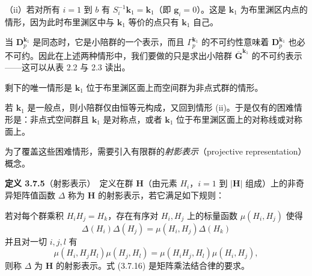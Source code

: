 （ii）若对所有 $i = 1$ 到 $b$ 有 $S^{-1}_{i}\mathbf{k}_{1} = \mathbf{k}_{1}$（即 $\mathbf{g}_{i} = 0$）。这是 $\mathbf{k}_{1}$ 为布里渊区内点的情形，因为此时布里渊区中与 $\mathbf{k}_{1}$ 等价的点只有 $\mathbf{k}_{1}$ 自己。

当 $\mathbf{D}^{\mathbf{k}_{1}}_{p}$ 是同态时，它是小陪群的一个表示，而且 $\Gamma^{\mathbf{k}_{1}}_{p}$ 的不可约性意味着 $\mathbf{D}^{\mathbf{k}_{1}}_{p}$ 也必不可约。因此在上述两种情形中，我们要做的只是求出小陪群 $\overline{\mathbf{G}}^{\mathbf{k}_{1}}$ 的不可约表示——这可以从表 2.2 与 2.3 读出。

剩下的唯一情形是 $\mathbf{k}_{1}$ 位于布里渊区面上而空间群为非点式群的情形。

若 $\mathbf{k}_{1}$ 是一般点，则小陪群仅由恒等元构成，又回到情形 (ii)。于是仅有的困难情形是：非点式空间群且 $\mathbf{k}_{1}$ 是对称点，或者 $\mathbf{k}_{1}$ 位于布里渊区面上的对称线或对称面上。

为了覆盖这些困难情形，需要引入有限群的\textit{射影表示}（projective representation）概念。

\noindent\textbf{定义 3.7.5}\quad （射影表示）\ 定义在群 $\mathbf{H}$（由元素 $H_{i}$，$i = 1$ 到 $|\mathbf{H}|$ 组成）上的非奇异矩阵值函数 $\Delta$ 称为 $\mathbf{H}$ 的射影表示，若它满足如下规则：

若对每个群乘积 $H_{i}H_{j} = H_{k}$，存在有序对 $H_{i}, H_{j}$ 上的标量函数 $\mu(H_{i}, H_{j})$ 使得
\begin{equation*}
\Delta(H_{i})\Delta(H_{j}) = \mu(H_{i}, H_{j})\Delta(H_{k})
\tag{3.7.15}
\end{equation*}
并且对一切 $i, j, l$ 有
\begin{equation*}
\mu(H_{i}, H_{j}H_{l})\mu(H_{j}, H_{l}) = \mu(H_{i}H_{j}, H_{l})\mu(H_{i}, H_{j}),
\tag{3.7.16}
\end{equation*}
则称 $\Delta$ 为 $\mathbf{H}$ 的射影表示。式 (3.7.16) 是矩阵乘法结合律的要求。

